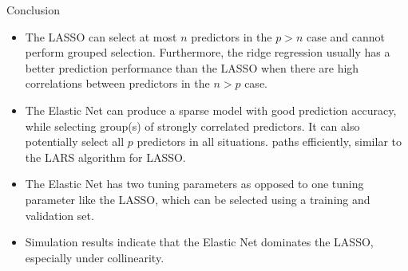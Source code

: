     \begin{frame}{Conclusion}
    \begin{itemize}
        \item The LASSO can select at most $n$ predictors in the $p>n$ case and cannot perform grouped selection. Furthermore, the ridge regression usually has a better prediction performance than the LASSO when there are high correlations between predictors in the $n>p$ case.
        \item The Elastic Net can produce a sparse model with good prediction accuracy, while
 selecting group(s) of strongly correlated predictors. It can also potentially select all $p$
 predictors in all situations.
 paths efficiently, similar to the LARS algorithm for LASSO.
        \item The Elastic Net has two tuning parameters as opposed to one tuning parameter like the LASSO, which can be selected using a training and validation set.
        \item Simulation results indicate that the Elastic Net dominates the LASSO, especially
 under collinearity.
    \end{itemize}
        
    \end{frame}

